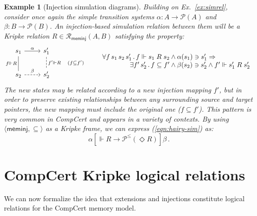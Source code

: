 \documentclass[draft,11pt]{report}
\newtheorem{example}{Example}
\newcommand{\kw}[1]{\ensuremath{ \mathsf{#1} }}
\newcommand{\ifr}[1]{\mathrel{[{#1}]}}
\begin{document}
\begin{example}[Injection simulation diagrams] \label{ex:sim} %
Building on Ex.~\ref{ex:simrel},
consider once again the simple transition systems
$\alpha : A \rightarrow \mathcal{P}(A)$ and
$\beta : B \rightarrow \mathcal{P}(B)$.
An injection-based simulation relation between them
will be a Kripke relation
$R \in \mathcal{R}_\kw{meminj}(A, B)$
satisfying the property:
\begin{equation}
    \label{eqn:hairy-sim}
  \begin{tikzcd}[scale=0.8]
    s_1 \arrow[r, "\alpha"]
        \arrow[d, dash, "f \Vdash R"'] &
    s_1' \arrow[d, dashed, dash, "f' \Vdash R \quad (f \subseteq f')"] \\
    s_2 \arrow[r, dashed, "\beta"] &
    s_2'
  \end{tikzcd}
  \qquad
    \begin{array}{r@{}l}
    \forall f \, s_1 \, s_2 \, s_1' \,.\,
      f \Vdash s_1 \mathrel{R} s_2 &{} \wedge
      \alpha(s_1) \ni s_1' \Rightarrow \\
    \exists f' \, s_2' \,.\,
      f \subseteq f' &{} \wedge
      \beta(s_2) \ni s_2' \wedge
      f' \Vdash s_1' \mathrel{R} s_2'
    \end{array}
\end{equation}
The new states may be related according to
a new injection mapping $f'$,
but in order to preserve existing relationships
between any surrounding source and target pointers,
the new mapping must include
the original one ($f \subseteq f'$).
This pattern is very common in CompCert
and appears in a variety of contexts.
By using $\langle \kw{meminj}, {\subseteq} \rangle$
as a Kripke frame,
we can express
(\ref{eqn:hairy-sim}) as:
\[
  \alpha \ifr{\Vdash R \rightarrow \mathcal{P}^\le(\Diamond R)} \beta \,.
\]
\end{example}


\section{CompCert Kripke logical relations} \label{sec:cklrdef} %

We can now formalize the idea that
extensions and injections
constitute logical relations for the CompCert memory model.
\end{document}
